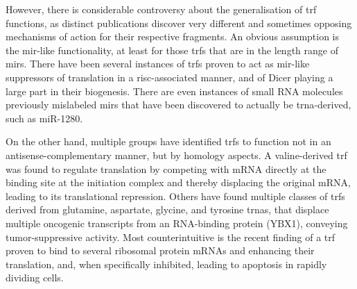 However, there is considerable controversy about the generalisation of \ac{trf} functions, as distinct publications discover very different and sometimes opposing mechanisms of action for their respective fragments. An obvious assumption is the \ac{mir}-like functionality, at least for those \acp{trf} that are in the length range of \acp{mir}. There have been several instances of \acp{trf} proven to act as \ac{mir}-like suppressors of translation in a \ac{risc}-associated manner\cite{Kumar2014}, and of Dicer playing a large part in their biogenesis\cite{Cole2009}. There are even instances of small RNA molecules previously mislabeled \acp{mir} that have been discovered to actually be \ac{trna}-derived, such as miR-1280\cite{Huang2017}.

On the other hand, multiple groups have identified \acp{trf} to function not in an antisense-complementary manner, but by homology aspects. A valine-derived \ac{trf} was found to regulate translation by competing with mRNA directly at the binding site at the initiation complex and thereby displacing the original mRNA, leading to its translational repression\cite{Gebetsberger2017}. Others have found multiple classes of \acp{trf} derived from glutamine, aspartate, glycine, and tyrosine \acp{trna}, that displace multiple oncogenic transcripts from an RNA-binding protein (YBX1), conveying tumor-suppressive activity\cite{Goodarzi2015}. Most counterintuitive is the recent finding of a \ac{trf} proven to bind to several ribosomal protein mRNAs and enhancing their translation, and, when specifically inhibited, leading to apoptosis in rapidly dividing cells\cite{Kim2017}.

